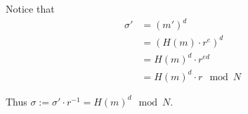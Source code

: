 Notice that 
\begin{align*}
    \sigma' &= (m')^d\\
    &= (H(m)\cdot r^e)^d\\
    &= H(m)^d \cdot r^{ed}\\
    &= H(m)^d \cdot r \mod N
\end{align*}

Thus $\sigma := \sigma' \cdot r^{-1} = H(m)^d \mod N$.












